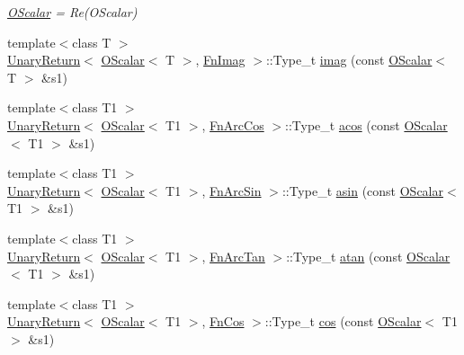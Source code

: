 \begin{DoxyCompactItemize}
\begin{DoxyCompactList}\small\item\em \mbox{\hyperlink{classENSEM_1_1OScalar}{O\+Scalar}} = Re(\+O\+Scalar) \end{DoxyCompactList}\item 
{\footnotesize template$<$class T $>$ }\\\mbox{\hyperlink{structENSEM_1_1UnaryReturn}{Unary\+Return}}$<$ \mbox{\hyperlink{classENSEM_1_1OScalar}{O\+Scalar}}$<$ T $>$, \mbox{\hyperlink{structENSEM_1_1FnImag}{Fn\+Imag}} $>$\+::Type\+\_\+t \mbox{\hyperlink{group__obsscalar_ga5c386e541e4c92b380ed34d5a27a6b13}{imag}} (const \mbox{\hyperlink{classENSEM_1_1OScalar}{O\+Scalar}}$<$ T $>$ \&s1)
\item 
{\footnotesize template$<$class T1 $>$ }\\\mbox{\hyperlink{structENSEM_1_1UnaryReturn}{Unary\+Return}}$<$ \mbox{\hyperlink{classENSEM_1_1OScalar}{O\+Scalar}}$<$ T1 $>$, \mbox{\hyperlink{structENSEM_1_1FnArcCos}{Fn\+Arc\+Cos}} $>$\+::Type\+\_\+t \mbox{\hyperlink{group__obsscalar_ga734866f3eb39843cc901768dff4f6283}{acos}} (const \mbox{\hyperlink{classENSEM_1_1OScalar}{O\+Scalar}}$<$ T1 $>$ \&s1)
\item 
{\footnotesize template$<$class T1 $>$ }\\\mbox{\hyperlink{structENSEM_1_1UnaryReturn}{Unary\+Return}}$<$ \mbox{\hyperlink{classENSEM_1_1OScalar}{O\+Scalar}}$<$ T1 $>$, \mbox{\hyperlink{structENSEM_1_1FnArcSin}{Fn\+Arc\+Sin}} $>$\+::Type\+\_\+t \mbox{\hyperlink{group__obsscalar_gac74c6933e6f290335c2ec508825d5fbb}{asin}} (const \mbox{\hyperlink{classENSEM_1_1OScalar}{O\+Scalar}}$<$ T1 $>$ \&s1)
\item 
{\footnotesize template$<$class T1 $>$ }\\\mbox{\hyperlink{structENSEM_1_1UnaryReturn}{Unary\+Return}}$<$ \mbox{\hyperlink{classENSEM_1_1OScalar}{O\+Scalar}}$<$ T1 $>$, \mbox{\hyperlink{structENSEM_1_1FnArcTan}{Fn\+Arc\+Tan}} $>$\+::Type\+\_\+t \mbox{\hyperlink{group__obsscalar_ga785cb0a8ba60f6a9a1f4494b5ac2533d}{atan}} (const \mbox{\hyperlink{classENSEM_1_1OScalar}{O\+Scalar}}$<$ T1 $>$ \&s1)
\item 
{\footnotesize template$<$class T1 $>$ }\\\mbox{\hyperlink{structENSEM_1_1UnaryReturn}{Unary\+Return}}$<$ \mbox{\hyperlink{classENSEM_1_1OScalar}{O\+Scalar}}$<$ T1 $>$, \mbox{\hyperlink{structENSEM_1_1FnCos}{Fn\+Cos}} $>$\+::Type\+\_\+t \mbox{\hyperlink{group__obsscalar_gab03cd6386bf0623d4effce724af5c124}{cos}} (const \mbox{\hyperlink{classENSEM_1_1OScalar}{O\+Scalar}}$<$ T1 $>$ \&s1)

\end{DoxyCompactItemize}
